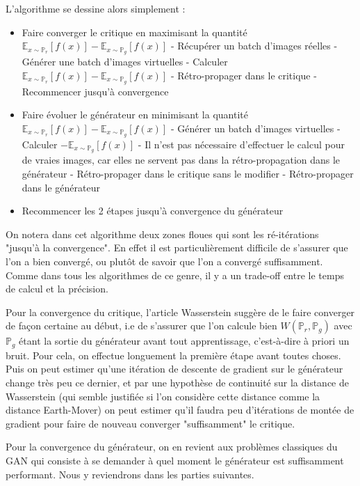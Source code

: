  L'algorithme se dessine alors simplement :
 \begin{itemize}
 \item Faire converger le critique en maximisant la quantité $\mathbb{E}_{x\sim\mathbb{P}_r}[f(x)] - \mathbb{E}_{x\sim\mathbb{P}_g}[f(x)] $
 \subitem - Récupérer un batch d'images réelles
 \subitem - Générer une batch d'images virtuelles
 \subitem - Calculer $\mathbb{E}_{x\sim\mathbb{P}_r}[f(x)] - \mathbb{E}_{x\sim\mathbb{P}_g}[f(x)] $
 \subitem - Rétro-propager dans le critique
 \subitem - Recommencer jusqu'à convergence
 \item Faire évoluer le générateur en minimisant la quantité $\mathbb{E}_{x\sim\mathbb{P}_r}[f(x)] - \mathbb{E}_{x\sim\mathbb{P}_g}[f(x)] $
 \subitem - Générer un batch d'images virtuelles
 \subitem - Calculer $- \mathbb{E}_{x\sim\mathbb{P}_g}[f(x)] $
 \subitem - Il n'est pas nécessaire d'effectuer le calcul pour de vraies images, car elles ne servent pas dans la rétro-propagation dans le générateur
 \subitem - Rétro-propager dans le critique sans le modifier
 \subitem - Rétro-propager dans le générateur
 \item Recommencer les 2 étapes jusqu'à convergence du générateur
 \end{itemize}

 On notera dans cet algorithme deux zones floues qui sont les ré-itérations "jusqu'à la convergence". En effet il est particulièrement difficile de s'assurer que l'on a bien convergé, ou plutôt de savoir que l'on a convergé suffisamment. Comme dans tous les algorithmes de ce genre, il y a un trade-off entre le temps de calcul et la précision.

 Pour la convergence du critique, l'article Wasserstein \cite{arjovsky_wasserstein_2017} suggère de le faire converger de façon certaine au début, i.e de s'assurer que l'on calcule bien $W ( \mathbb{P}_r, \mathbb{P}_g ) $ avec $\mathbb{P}_g$ étant la sortie du générateur avant tout apprentissage, c'est-à-dire à priori un bruit. Pour cela, on effectue longuement la première étape avant toutes choses. Puis on peut estimer qu'une itération de descente de gradient sur le générateur change très peu ce dernier, et par une hypothèse de continuité sur la distance de Wasserstein (qui semble justifiée si l'on considère cette distance comme la distance Earth-Mover) on peut estimer qu'il faudra peu d'itérations de montée de gradient pour faire de nouveau converger "suffisamment" le critique.

 Pour la convergence du générateur, on en revient aux problèmes classiques du GAN qui consiste à se demander à quel moment le générateur est suffisamment performant. Nous y reviendrons dans les parties suivantes.

